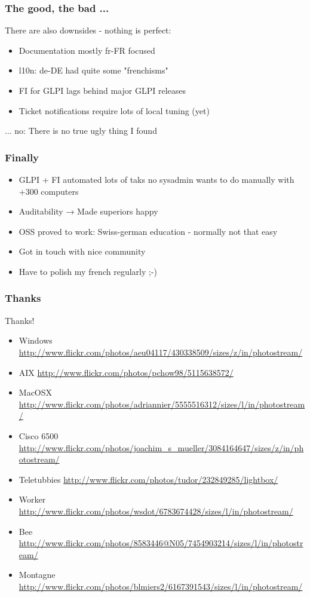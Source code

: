 \documentclass{beamer}
\begin{document}
\begin{frame}
    \frametitle{The good, the bad ...}
    There are also downsides - nothing is perfect:
    \begin{itemize}
	\item Documentation mostly fr-FR focused
	\item l10n: de-DE had quite some "frenchisms"
	\item FI for GLPI lags behind major GLPI releases
	\item Ticket notifications require lots of local tuning (yet)
    \end{itemize}
    ... no: There is no true ugly thing I found
\end{frame}

\begin{frame}
    \frametitle{Finally}
    \begin{itemize}
	\item GLPI + FI automated lots of taks no sysadmin wants to do manually with +300 computers
	\item Auditability →  Made superiors happy
	\item OSS proved to work: Swiss-german education - normally not that easy
	\item Got in touch with nice community
	\item Have to polish my french regularly ;-)
    \end{itemize}
\end{frame}

\begin{frame}
    \frametitle{Thanks}

    \begin{block}{Thanks!}
        \begin{itemize}
            \item Windows \url{http://www.flickr.com/photos/aeu04117/430338509/sizes/z/in/photostream/}
            \item AIX \url{http://www.flickr.com/photos/pchow98/5115638572/}
            \item MacOSX \url{http://www.flickr.com/photos/adriannier/5555516312/sizes/l/in/photostream/}
            \item Cisco 6500 \url{http://www.flickr.com/photos/joachim\_s\_mueller/3084164647/sizes/z/in/photostream/}
            \item Teletubbies \url{http://www.flickr.com/photos/tudor/232849285/lightbox/}
            \item Worker \url{http://www.flickr.com/photos/wsdot/6783674428/sizes/l/in/photostream/}
            \item Bee \url{http://www.flickr.com/photos/8583446@N05/7454903214/sizes/l/in/photostream/}
            \item Montagne \url{http://www.flickr.com/photos/blmiers2/6167391543/sizes/l/in/photostream/} 
        \end{itemize}
    \end{block}
\end{frame}
\end{document}
